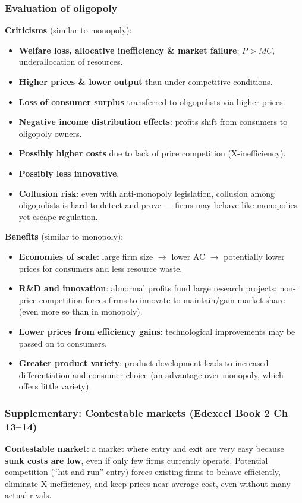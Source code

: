 \documentclass[a4paper,12pt]{article}
\newcommand{\needbold}[1]{\textcolor{red!70!black}{\textbf{#1}}}
\begin{document}
\subsubsection*{Evaluation of oligopoly}
\textbf{Criticisms} (similar to monopoly):
\begin{itemize}
  \item \textbf{Welfare loss, allocative inefficiency \& market failure}: $P > MC$, underallocation of resources.
  \item \textbf{Higher prices \& lower output} than under competitive conditions.
  \item \textbf{Loss of consumer surplus} transferred to oligopolists via higher prices.
  \item \textbf{Negative income distribution effects}: profits shift from consumers to oligopoly owners.
  \item \textbf{Possibly higher costs} due to lack of price competition (X-inefficiency).
  \item \textbf{Possibly less innovative}.
  \item \textbf{Collusion risk}: even with anti-monopoly legislation, collusion among oligopolists is hard to detect and prove --- firms may behave like monopolies yet escape regulation.
\end{itemize}
\textbf{Benefits} (similar to monopoly):
\begin{itemize}
  \item \textbf{Economies of scale}: large firm size $\to$ lower AC $\to$ potentially lower prices for consumers and less resource waste.
  \item \textbf{R\&D and innovation}: abnormal profits fund large research projects; non-price competition forces firms to innovate to maintain/gain market share (even more so than in monopoly).
  \item \textbf{Lower prices from efficiency gains}: technological improvements may be passed on to consumers.
  \item \textbf{Greater product variety}: product development leads to increased differentiation and consumer choice (an advantage over monopoly, which offers little variety).
\end{itemize}
\subsubsection*{Supplementary: Contestable markets (Edexcel Book 2 Ch 13--14)}
\needbold{Contestable market}: a market where entry and exit are very easy because \textbf{sunk costs are low}, even if only few firms currently operate. Potential competition (``hit-and-run'' entry) forces existing firms to behave efficiently, eliminate X-inefficiency, and keep prices near average cost, even without many actual rivals.
\end{document}
